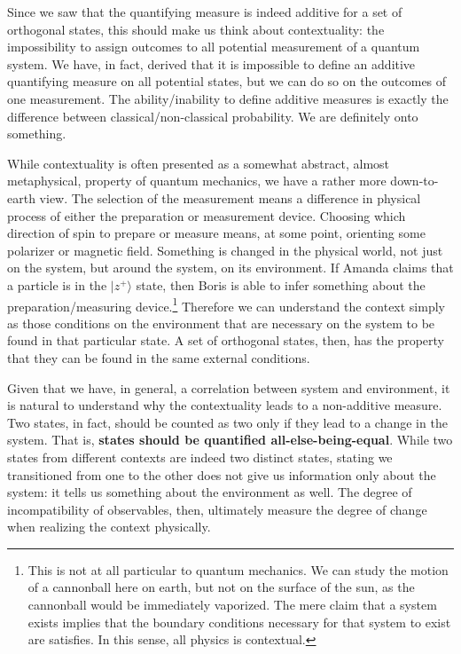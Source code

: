 \documentclass[10pt,twocolumn, nofootinbib]{revtex4-2}
\def\>{\rangle}
\begin{document}
Since we saw that the quantifying measure is indeed additive for a set of orthogonal states, this should make us think about contextuality: the impossibility to assign outcomes to all potential measurement of a quantum system. We have, in fact, derived that it is impossible to define an additive quantifying measure on all potential states, but we can do so on the outcomes of one measurement. The ability/inability to define additive measures is exactly the difference between classical/non-classical probability. We are definitely onto something.

While contextuality is often presented as a somewhat abstract, almost metaphysical, property of quantum mechanics, we have a rather more down-to-earth view. The selection of the measurement means a difference in physical process of either the preparation or measurement device. Choosing which direction of spin to prepare or measure means, at some point, orienting some polarizer or magnetic field. Something is changed in the physical world, not just on the system, but around the system, on its environment. If Amanda claims that a particle is in the $|z^+\>$ state, then Boris is able to infer something about the preparation/measuring device.\footnote{This is not at all particular to quantum mechanics. We can study the motion of a cannonball here on earth, but not on the surface of the sun, as the cannonball would be immediately vaporized. The mere claim that a system exists implies that the boundary conditions necessary for that system to exist are satisfies. In this sense, all physics is contextual.} Therefore we can understand the context simply as those conditions on the environment that are necessary on the system to be found in that particular state. A set of orthogonal states, then, has the property that they can be found in the same external conditions.

Given that we have, in general, a correlation between system and environment, it is natural to understand why the contextuality leads to a non-additive measure. Two states, in fact, should be counted as two only if they lead to a change in the system. That is, \textbf{states should be quantified all-else-being-equal}. While two states from different contexts are indeed two distinct states, stating we transitioned from one to the other does not give us information only about the system: it tells us something about the environment as well. The degree of incompatibility of observables, then, ultimately measure the degree of change when realizing the context physically.
\end{document}
